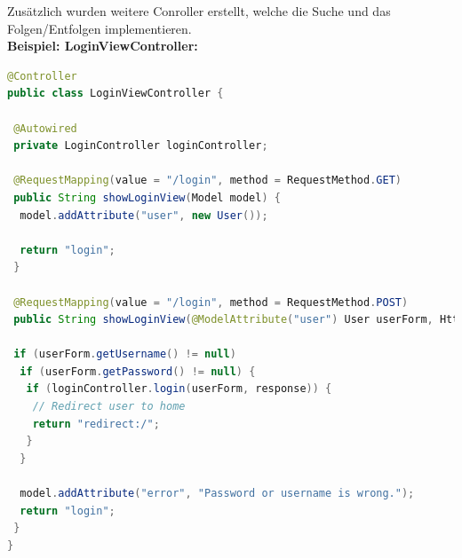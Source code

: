 \documentclass[
    a4paper
]{scrreprt}
\begin{document}
	Zusätzlich wurden weitere Conroller erstellt, welche die Suche und das Folgen/Entfolgen implementieren.\\
	
	\textbf{Beispiel: LoginViewController:}
	\begin{lstlisting}[language=java]
@Controller
public class LoginViewController {

 @Autowired
 private LoginController loginController;

 @RequestMapping(value = "/login", method = RequestMethod.GET)
 public String showLoginView(Model model) {
  model.addAttribute("user", new User());

  return "login";
 }

 @RequestMapping(value = "/login", method = RequestMethod.POST)
 public String showLoginView(@ModelAttribute("user") User userForm, HttpServletResponse response, Model model) {

 if (userForm.getUsername() != null)
  if (userForm.getPassword() != null) {
   if (loginController.login(userForm, response)) {
    // Redirect user to home
    return "redirect:/";
   }
  }

  model.addAttribute("error", "Password or username is wrong.");
  return "login";
 }
}
	\end{lstlisting}

\end{document}
